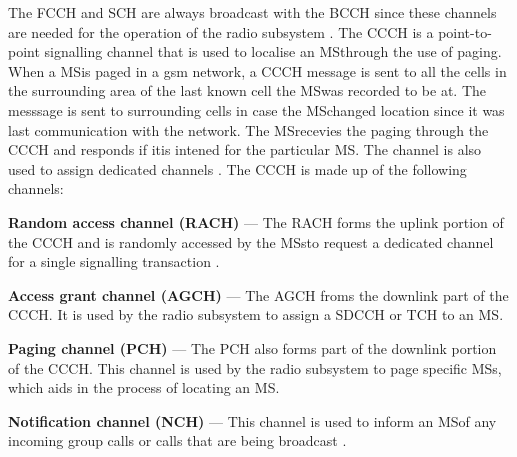 The FCCH and SCH are always broadcast with the BCCH since these channels are needed for the operation of the radio subsystem \cite{GSMArchitectureProtocolsServices}. The CCCH is a point-to-point signalling channel that is used to localise an \gls{MS}through the use of paging\cite{GSMArchitectureProtocolsServices}. When a \gls{MS}is paged in a \gls{gsm} network, a CCCH message is sent to all the cells in the surrounding area of the last known cell the \gls{MS}was recorded to be at\cite{GSMArchitectureProtocolsServices}. The messsage is sent to surrounding cells in case the \gls{MS}changed location since it was last communication with the network\cite{GSMArchitectureProtocolsServices}. The \gls{MS}recevies the paging through the CCCH and responds if itis intened for the particular MS\cite{GSMArchitectureProtocolsServices}. The channel is also used to assign dedicated channels \cite{GSMArchitectureProtocolsServices}. The CCCH is made up of the following channels:
\begin{description}
\item{\textbf{Random access channel (RACH)}} --- The RACH forms the uplink portion of the CCCH and is randomly accessed by the \glspl{MS}to request a dedicated channel for a single signalling transaction \cite{GSMArchitectureProtocolsServices}.
\item{\textbf{Access grant channel (AGCH)}} --- The AGCH froms the downlink part of the CCCH\@. It is used by the radio subsystem to assign a SDCCH or TCH to an \gls{MS}\cite{GSMArchitectureProtocolsServices}.
\item{\textbf{Paging channel (PCH)}} --- The PCH also forms part of the downlink portion of the CCCH\@. This channel is used by the radio subsystem to page specific MSs, which aids in the process of locating an \gls{MS}\cite{GSMArchitectureProtocolsServices}.
\item{\textbf{Notification channel (NCH)}} --- This channel is used to inform an \gls{MS}of any incoming group calls or calls that are being broadcast \cite{GSMArchitectureProtocolsServices}.
\end{description}

